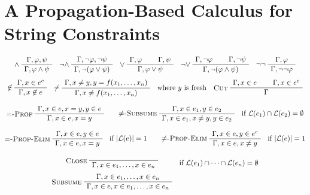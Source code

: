 
\section{A Propagation-Based Calculus for String Constraints}
\label{sect:calculus}

\begin{table}
  \caption{Rules of the one-sided sequent calculus. A term
    $e^c$ denotes the complement of a regular expression~$e$,  i.e.,
    ~$\lang{e^c} = \Sigma^* \setminus \lang{e}$.}
  \label{tab:calculus}
  
  \begin{gather*}
    \infer[$\wedge$]
    {\seqq{\varphi \wedge \psi}}
    {\seqq{\varphi, \psi}}
    \quad
    \infer[$\neg\wedge$]
    {\seqq{ \neg(\varphi \vee \psi)}}
    {\seqq{ \neg\varphi, \neg\psi}}
    \quad
    \inferii[$\vee$]
    {\seqq{\varphi \vee \psi}}
    {\seqq{\varphi}}{\seqq{\psi}}
    \quad
    \inferii[$\neg\vee$]
    {\seqq{\neg(\varphi \wedge \psi)}}
    {\seqq{\neg\varphi}}{\seqq{\neg\psi}}
    \quad
    \infer[$\neg\neg$]
    {\seqq{ \neg\neg\varphi}}
    {\seqq{\varphi}}
    \\[1ex]
    \infer[$\not\in$]
    {\seqq{x \not\in e}}
    {\seqq{x \in e^c}}
    \quad
    \inferC[\ruleName{$\not=$}]{\text{where~} y \text{~is fresh}}
    {\seqq{x \not= f(x_1, \ldots, x_n)}}
    {\seqq{x \not= y, y = f(x_1, \ldots, x_n)}}
    \quad
    \inferii[Cut]
    {\seqq{}}
    {\seqq{x \in e}}{\seqq{x \in e^c}}
    \\[2ex]
    \infer[$=$-Prop]
    {\seqq{x \in e, x = y}}
    {\seqq{x \in e, x = y, y \in e}}
    \qquad
    \inferC[$\not=$-Subsume]{\text{if~} \lang{e_1} \cap \lang{e_2} = \emptyset}
    {\seqq{x \in e_1, x \not= y, y \in e_2}}
    {\seqq{x \in e_1, y \in e_2}}
    \\[2ex]
    \inferC[$=$-Prop-Elim]{\text{if~} |\lang{e}| = 1}
    {\seqq{x \in e, x = y}}
    {\seqq{x \in e, y \in e}}
    \qquad
    \inferC[$\not=$-Prop-Elim]{\text{if~} |\lang{e}| = 1}
    {\seqq{x \in e, x \not= y}}
    {\seqq{x \in e, y \in e^c}}
    \\[3ex]
    \begin{array}{@{}cl@{}}
      \infer[Close]
      {\seqq{x \in e_1, \ldots, x \in e_n}}
      {}
      &
        \text{if~} \lang{e_1} \cap \cdots \cap\lang{e_n} = \emptyset
      \\[2ex]
      \infer[Subsume]
      {\seqq{x \in e, x \in e_1, \ldots, x \in e_n}}
      {\seqq{x \in e_1, \ldots, x \in e_n}}

\end{array}
\end{gather*}
\end{table}
